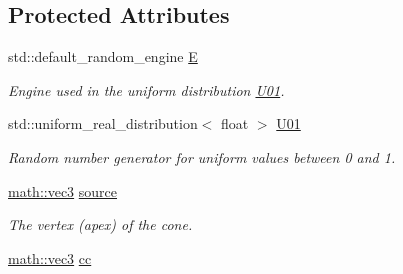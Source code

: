 \subsection*{Protected Attributes}
\begin{DoxyCompactItemize}
\item 
\mbox{\label{classphysim_1_1emitters_1_1free__emitters_1_1hose_a9aa2c30faa0d53057d1b1b2cb44d45cf}} 
std\+::default\+\_\+random\+\_\+engine \hyperlink{classphysim_1_1emitters_1_1free__emitters_1_1hose_a9aa2c30faa0d53057d1b1b2cb44d45cf}{E}
\begin{DoxyCompactList}\small\item\em Engine used in the uniform distribution \hyperlink{classphysim_1_1emitters_1_1free__emitters_1_1hose_a052854d482c3c10996080eeb1f022857}{U01}. \end{DoxyCompactList}\item 
\mbox{\label{classphysim_1_1emitters_1_1free__emitters_1_1hose_a052854d482c3c10996080eeb1f022857}} 
std\+::uniform\+\_\+real\+\_\+distribution$<$ float $>$ \hyperlink{classphysim_1_1emitters_1_1free__emitters_1_1hose_a052854d482c3c10996080eeb1f022857}{U01}
\begin{DoxyCompactList}\small\item\em Random number generator for uniform values between 0 and 1. \end{DoxyCompactList}\item 
\mbox{\label{classphysim_1_1emitters_1_1free__emitters_1_1hose_a0b4f4a66f8eda0638692f3f45e301cd1}} 
\hyperlink{structphysim_1_1math_1_1vec3}{math\+::vec3} \hyperlink{classphysim_1_1emitters_1_1free__emitters_1_1hose_a0b4f4a66f8eda0638692f3f45e301cd1}{source}
\begin{DoxyCompactList}\small\item\em The vertex (apex) of the cone. \end{DoxyCompactList}\item 
\mbox{\label{classphysim_1_1emitters_1_1free__emitters_1_1hose_ace1e6f8f24a7d1649be59e40234fc1ed}} 
\hyperlink{structphysim_1_1math_1_1vec3}{math\+::vec3} \hyperlink{classphysim_1_1emitters_1_1free__emitters_1_1hose_ace1e6f8f24a7d1649be59e40234fc1ed}{cc}

\end{DoxyCompactItemize}
